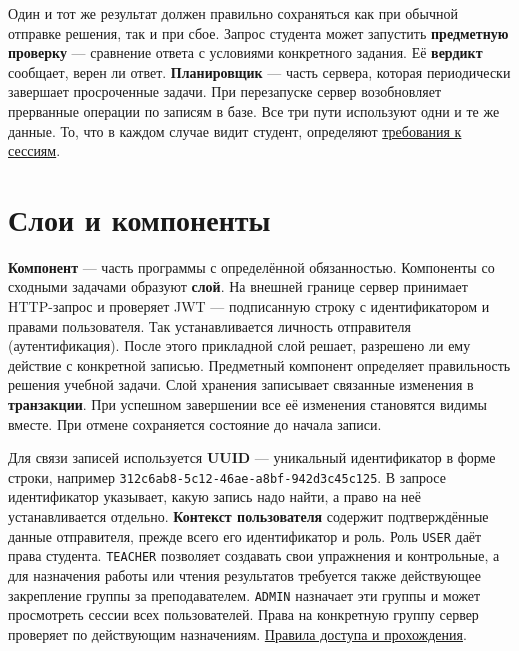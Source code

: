 \documentclass[12pt,a4paper]{article}
\begin{document}
Один и тот же результат должен правильно сохраняться как при обычной отправке решения, так и при сбое. Запрос студента может запустить \textbf{предметную проверку} --- сравнение ответа с условиями конкретного задания. Её \textbf{вердикт} сообщает, верен ли ответ. \textbf{Планировщик} --- часть сервера, которая периодически завершает просроченные задачи. При перезапуске сервер возобновляет прерванные операции по записям в базе. Все три пути используют одни и те же данные. То, что в каждом случае видит студент, определяют {\href{../04\_Системные\_требования/DOC-05\_Системные\_требования.pdf\#doc-05-требования-к-сессиям-задач}{требования к сессиям}}.

\section{Слои и компоненты}\label{2-ux441ux43bux43eux438-ux438-ux43aux43eux43cux43fux43eux43dux435ux43dux442ux44b}

\hypertarget{2-слои-и-компоненты}{}

\textbf{Компонент} --- часть программы с определённой обязанностью. Компоненты со сходными задачами образуют \textbf{слой}. На внешней границе сервер принимает HTTP-запрос и проверяет JWT --- подписанную строку с идентификатором и правами пользователя. Так устанавливается личность отправителя (аутентификация). После этого прикладной слой решает, разрешено ли ему действие с конкретной записью. Предметный компонент определяет правильность решения учебной задачи. Слой хранения записывает связанные изменения в \textbf{транзакции}. При успешном завершении все её изменения становятся видимы вместе. При отмене сохраняется состояние до начала записи.

Для связи записей используется \textbf{UUID} --- уникальный идентификатор в форме строки, например \texttt{312c6ab8-\allowbreak{}5c12-\allowbreak{}46ae-\allowbreak{}a8bf-\allowbreak{}942d3c45c125}. В запросе идентификатор указывает, какую запись надо найти, а право на неё устанавливается отдельно. \textbf{Контекст пользователя} содержит подтверждённые данные отправителя, прежде всего его идентификатор и роль. Роль \texttt{USER} даёт права студента. \texttt{TEACHER} позволяет создавать свои упражнения и контрольные, а для назначения работы или чтения результатов требуется также действующее закрепление группы за преподавателем. \texttt{ADMIN} назначает эти группы и может просмотреть сессии всех пользователей. Права на конкретную группу сервер проверяет по действующим назначениям. {\href{../02\_Техническое\_задание/Техническое\_задание.pdf\#правила-доступа-и-прохождения-контрольного-мероприятия}{Правила доступа и прохождения}}.
\end{document}
